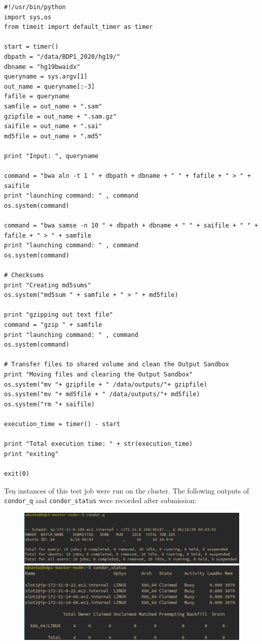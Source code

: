 \documentclass{article}
\begin{document}
\begin{lstlisting}
#!/usr/bin/python
import sys,os
from timeit import default_timer as timer

start = timer()
dbpath = "/data/BDP1_2020/hg19/"
dbname = "hg19bwaidx"
queryname = sys.argv[1]
out_name = queryname[:-3]
fafile = queryname
samfile = out_name + ".sam"
gzipfile = out_name + ".sam.gz"
saifile = out_name + ".sai"
md5file = out_name + ".md5"

print "Input: ", queryname

command = "bwa aln -t 1 " + dbpath + dbname + " " + fafile + " > " + saifile
print "launching command: " , command
os.system(command)

command = "bwa samse -n 10 " + dbpath + dbname + " " + saifile + " " + fafile + " > " + samfile
print "launching command: " , command
os.system(command)

# Checksums
print "Creating md5sums"
os.system("md5sum " + samfile + " > " + md5file)

print "gzipping out text file"
command = "gzip " + samfile
print "launching command: " , command
os.system(command)

# Transfer files to shared volume and clean the Output Sandbox
print "Moving files and clearing the Output Sandbox"
os.system("mv "+ gzipfile + " /data/outputs/"+ gzipfile)
os.system("mv "+ md5file + " /data/outputs/"+ md5file)
os.system("rm "+ saifile)

execution_time = timer() - start

print "Total execution time: " + str(execution_time)
print "exiting"

exit(0)
\end{lstlisting}

Ten instances of this test job were run on the cluster.
The following outputs of \texttt{condor\_q} and \texttt{condor\_status} were recorded after submission:

\begin{figure}[!h]
    \center
    \includegraphics[width=\textwidth]{./images/condor_q.png}
    \includegraphics[width=\textwidth]{./images/condor_status_busy.png}
\end{figure}
\FloatBarrier
\end{document}
